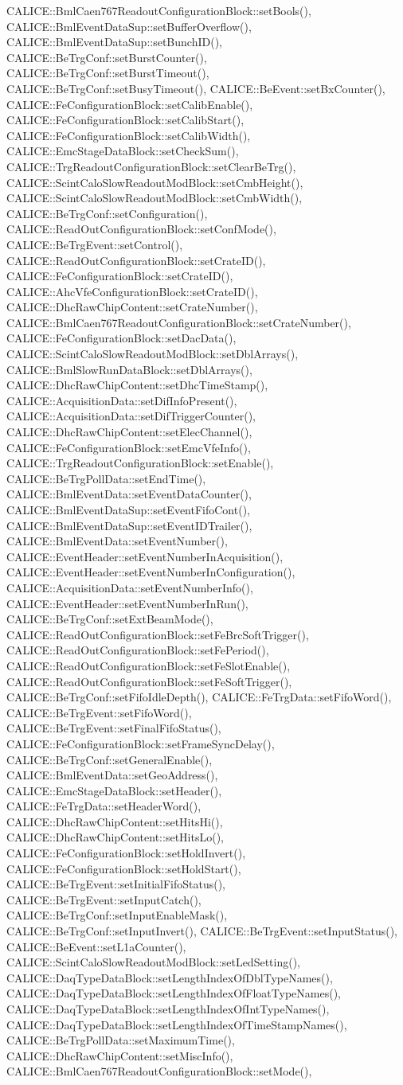 CALICE::BmlCaen767ReadoutConfigurationBlock::setBools(), CALICE::BmlEventDataSup::setBufferOverflow(), CALICE::BmlEventDataSup::setBunchID(), CALICE::BeTrgConf::setBurstCounter(), CALICE::BeTrgConf::setBurstTimeout(), CALICE::BeTrgConf::setBusyTimeout(), CALICE::BeEvent::setBxCounter(), CALICE::FeConfigurationBlock::setCalibEnable(), CALICE::FeConfigurationBlock::setCalibStart(), CALICE::FeConfigurationBlock::setCalibWidth(), CALICE::EmcStageDataBlock::setCheckSum(), CALICE::TrgReadoutConfigurationBlock::setClearBeTrg(), CALICE::ScintCaloSlowReadoutModBlock::setCmbHeight(), CALICE::ScintCaloSlowReadoutModBlock::setCmbWidth(), CALICE::BeTrgConf::setConfiguration(), CALICE::ReadOutConfigurationBlock::setConfMode(), CALICE::BeTrgEvent::setControl(), CALICE::ReadOutConfigurationBlock::setCrateID(), CALICE::FeConfigurationBlock::setCrateID(), CALICE::AhcVfeConfigurationBlock::setCrateID(), CALICE::DhcRawChipContent::setCrateNumber(), CALICE::BmlCaen767ReadoutConfigurationBlock::setCrateNumber(), CALICE::FeConfigurationBlock::setDacData(), CALICE::ScintCaloSlowReadoutModBlock::setDblArrays(), CALICE::BmlSlowRunDataBlock::setDblArrays(), CALICE::DhcRawChipContent::setDhcTimeStamp(), CALICE::AcquisitionData::setDifInfoPresent(), CALICE::AcquisitionData::setDifTriggerCounter(), CALICE::DhcRawChipContent::setElecChannel(), CALICE::FeConfigurationBlock::setEmcVfeInfo(), CALICE::TrgReadoutConfigurationBlock::setEnable(), CALICE::BeTrgPollData::setEndTime(), CALICE::BmlEventData::setEventDataCounter(), CALICE::BmlEventDataSup::setEventFifoCont(), CALICE::BmlEventDataSup::setEventIDTrailer(), CALICE::BmlEventData::setEventNumber(), CALICE::EventHeader::setEventNumberInAcquisition(), CALICE::EventHeader::setEventNumberInConfiguration(), CALICE::AcquisitionData::setEventNumberInfo(), CALICE::EventHeader::setEventNumberInRun(), CALICE::BeTrgConf::setExtBeamMode(), CALICE::ReadOutConfigurationBlock::setFeBrcSoftTrigger(), CALICE::ReadOutConfigurationBlock::setFePeriod(), CALICE::ReadOutConfigurationBlock::setFeSlotEnable(), CALICE::ReadOutConfigurationBlock::setFeSoftTrigger(), CALICE::BeTrgConf::setFifoIdleDepth(), CALICE::FeTrgData::setFifoWord(), CALICE::BeTrgEvent::setFifoWord(), CALICE::BeTrgEvent::setFinalFifoStatus(), CALICE::FeConfigurationBlock::setFrameSyncDelay(), CALICE::BeTrgConf::setGeneralEnable(), CALICE::BmlEventData::setGeoAddress(), CALICE::EmcStageDataBlock::setHeader(), CALICE::FeTrgData::setHeaderWord(), CALICE::DhcRawChipContent::setHitsHi(), CALICE::DhcRawChipContent::setHitsLo(), CALICE::FeConfigurationBlock::setHoldInvert(), CALICE::FeConfigurationBlock::setHoldStart(), CALICE::BeTrgEvent::setInitialFifoStatus(), CALICE::BeTrgEvent::setInputCatch(), CALICE::BeTrgConf::setInputEnableMask(), CALICE::BeTrgConf::setInputInvert(), CALICE::BeTrgEvent::setInputStatus(), CALICE::BeEvent::setL1aCounter(), CALICE::ScintCaloSlowReadoutModBlock::setLedSetting(), CALICE::DaqTypeDataBlock::setLengthIndexOfDblTypeNames(), CALICE::DaqTypeDataBlock::setLengthIndexOfFloatTypeNames(), CALICE::DaqTypeDataBlock::setLengthIndexOfIntTypeNames(), CALICE::DaqTypeDataBlock::setLengthIndexOfTimeStampNames(), CALICE::BeTrgPollData::setMaximumTime(), CALICE::DhcRawChipContent::setMiscInfo(), CALICE::BmlCaen767ReadoutConfigurationBlock::setMode(), 